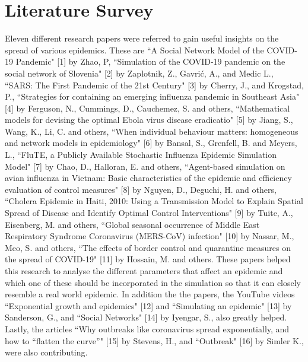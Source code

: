 \documentclass[conference]{IEEEtran}
\begin{document}
    \section{Literature Survey}
    Eleven different research papers were referred to gain useful insights on the spread of various epidemics. These are ``A Social Network Model of the COVID-19 Pandemic" [1] by Zhao, P, ``Simulation of the COVID-19 pandemic on the social network of Slovenia" [2] by Zaplotnik, Z., Gavrić, A., and Medic L., ``SARS: The First Pandemic of the 21st Century" [3] by Cherry, J., and Krogstad, P., ``Strategies for containing an emerging influenza pandemic in Southeast Asia" [4] by Ferguson, N., Cummings, D., Cauchemez, S. and others, ``Mathematical models for devising the optimal Ebola virus disease eradicatio" [5] by Jiang, S., Wang, K., Li, C. and others, ``When individual behaviour matters: homogeneous and network models in epidemiology" [6] by Bansal, S., Grenfell, B. and Meyers, L., ``FluTE, a Publicly Available Stochastic Influenza Epidemic Simulation Model" [7] by Chao, D., Halloran, E. and others, ``Agent-based simulation on avian influenza in Vietnam: Basic characteristics of the epidemic and efficiency evaluation of control measures" [8] by Nguyen, D., Deguchi, H. and others, ``Cholera Epidemic in Haiti, 2010: Using a Transmission Model to Explain Spatial Spread of Disease and Identify Optimal Control Interventions" [9] by Tuite, A., Eisenberg, M. and others, ``Global seasonal occurrence of Middle East Respiratory Syndrome Coronavirus (MERS-CoV) infection" [10] by Nassar, M., Meo, S. and others, ``The effects of border control and quarantine measures on the spread of COVID-19" [11] by Hossain, M. and others. These papers helped this research to analyse the different parameters that affect an epidemic and which one of these should be incorporated in the simulation so that it can closely resemble a real world epidemic. In addition the the papers, the YouTube videos ``Exponential growth and epidemics" [12] and ``Simulating an epidemic" [13] by Sanderson, G., and ``Social Networks" [14] by Iyengar, S., also greatly helped. Lastly, the articles ``Why outbreaks like coronavirus spread exponentially, and how to “flatten the curve”" [15] by Stevens, H., and ``Outbreak" [16] by Simler K., were also contributing.\\
    
\end{document}
